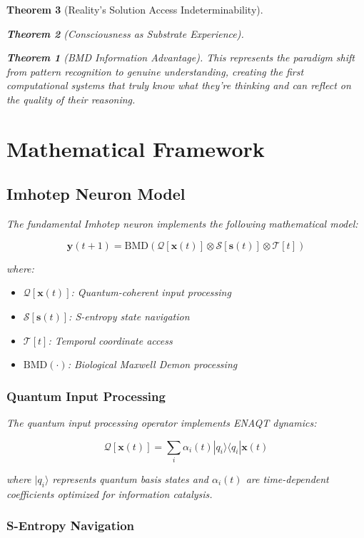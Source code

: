 \documentclass[12pt,a4paper]{article}
\newtheorem{theorem}{Theorem}[section]
\theoremstyle{remark}
\begin{document}
\begin{theorem}[Reality's Solution Access Indeterminability]
\begin{theorem}[Consciousness as Substrate Experience]
\begin{theorem}[BMD Information Advantage]
{{{This represents the paradigm shift from pattern recognition to genuine understanding, creating the first computational systems that truly know what they're thinking and can reflect on the quality of their reasoning.

\section{Mathematical Framework}

\subsection{Imhotep Neuron Model}

The fundamental Imhotep neuron implements the following mathematical model:

\begin{equation}
\mathbf{y}(t+1) = \text{BMD}\left(\mathcal{Q}[\mathbf{x}(t)] \otimes \mathcal{S}[\mathbf{s}(t)] \otimes \mathcal{T}[t]\right)
\end{equation}

where:
\begin{itemize}
\item $\mathcal{Q}[\mathbf{x}(t)]$: Quantum-coherent input processing
\item $\mathcal{S}[\mathbf{s}(t)]$: S-entropy state navigation
\item $\mathcal{T}[t]$: Temporal coordinate access
\item $\text{BMD}(\cdot)$: Biological Maxwell Demon processing
\end{itemize}

\subsubsection{Quantum Input Processing}

The quantum input processing operator implements ENAQT dynamics:

\begin{equation}
\mathcal{Q}[\mathbf{x}(t)] = \sum_i \alpha_i(t) |q_i\rangle \langle q_i| \mathbf{x}(t)
\end{equation}

where $|q_i\rangle$ represents quantum basis states and $\alpha_i(t)$ are time-dependent coefficients optimized for information catalysis.

\subsubsection{S-Entropy Navigation}

}}}
\end{theorem}
\end{theorem}
\end{theorem}
\end{document}
